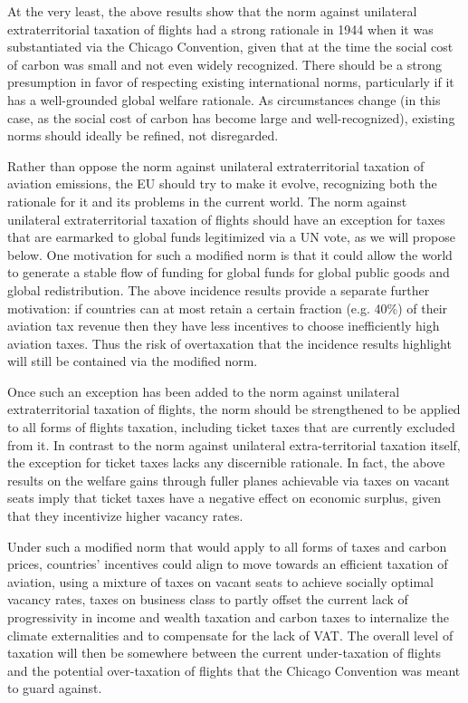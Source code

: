 At the very least, the above results show that the norm against unilateral extraterritorial taxation of flights had a strong rationale in 1944 when it was substantiated via the Chicago Convention, given that at the time the social cost of carbon was small and not even widely recognized. There should be a strong presumption in favor of respecting existing international norms, particularly if it has a well-grounded global welfare rationale. As circumstances change (in this case, as the social cost of carbon has become large and well-recognized), existing norms should ideally be refined, not disregarded.

  Rather  than oppose the norm against unilateral extraterritorial taxation of aviation emissions, the EU should try to make it evolve, recognizing both the rationale for it and its problems in the current world. The norm against unilateral extraterritorial taxation of flights should have an exception for taxes that are earmarked to global funds legitimized via a UN vote, as we will propose below. One motivation for such a modified norm is that it could allow the world to generate a stable flow of funding for global funds for global public goods and global redistribution. The above incidence results provide a separate further motivation: if countries can at most retain a certain fraction (e.g. 40\%) of their aviation tax revenue then they have less incentives to choose inefficiently high aviation taxes. Thus the risk of overtaxation that the incidence results highlight will still be contained via the modified norm.

  Once such an exception has been added to the norm against unilateral extraterritorial taxation of flights, the norm should be strengthened to be applied to all forms of flights taxation, including ticket taxes that are currently excluded from it. In contrast to the norm against unilateral extra-territorial taxation itself, the exception for ticket taxes lacks any discernible rationale. In fact, the above results on the welfare gains through fuller planes achievable via taxes on vacant seats imply that ticket taxes have a negative effect on economic surplus, given that they incentivize higher vacancy rates.

  Under such a modified norm that would apply to all forms of taxes and carbon prices, countries' incentives could align to move towards an efficient taxation of aviation, using a mixture of taxes on vacant seats to achieve socially optimal vacancy rates, taxes on business class to partly offset the current lack of progressivity in income and wealth taxation %
  and carbon taxes to internalize the climate externalities and to compensate for the lack of VAT. The overall level of taxation will then be somewhere between the current under-taxation of flights and the potential over-taxation of flights that the Chicago Convention was meant to guard against.





